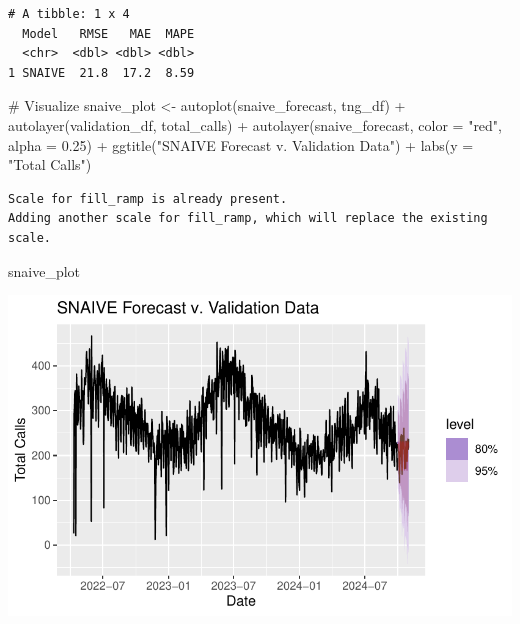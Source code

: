 \documentclass[
  letterpaper,
  DIV=11,
  numbers=noendperiod]{scrartcl}
\newenvironment{Shaded}{\begin{snugshade}}{\end{snugshade}}
\newcommand{\AttributeTok}[1]{\textcolor[rgb]{0.40,0.45,0.13}{#1}}
\newcommand{\CommentTok}[1]{\textcolor[rgb]{0.37,0.37,0.37}{#1}}
\newcommand{\FloatTok}[1]{\textcolor[rgb]{0.68,0.00,0.00}{#1}}
\newcommand{\FunctionTok}[1]{\textcolor[rgb]{0.28,0.35,0.67}{#1}}
\newcommand{\NormalTok}[1]{\textcolor[rgb]{0.00,0.23,0.31}{#1}}
\newcommand{\OtherTok}[1]{\textcolor[rgb]{0.00,0.23,0.31}{#1}}
\newcommand{\SpecialCharTok}[1]{\textcolor[rgb]{0.37,0.37,0.37}{#1}}
\newcommand{\StringTok}[1]{\textcolor[rgb]{0.13,0.47,0.30}{#1}}
\begin{document}
\begin{verbatim}
# A tibble: 1 x 4
  Model   RMSE   MAE  MAPE
  <chr>  <dbl> <dbl> <dbl>
1 SNAIVE  21.8  17.2  8.59
\end{verbatim}

\begin{Shaded}
\begin{Highlighting}[]
\CommentTok{\# Visualize}
\NormalTok{snaive\_plot }\OtherTok{\textless{}{-}} \FunctionTok{autoplot}\NormalTok{(snaive\_forecast, tng\_df) }\SpecialCharTok{+} 
  \FunctionTok{autolayer}\NormalTok{(validation\_df, total\_calls) }\SpecialCharTok{+} 
  \FunctionTok{autolayer}\NormalTok{(snaive\_forecast, }\AttributeTok{color =} \StringTok{"red"}\NormalTok{, }\AttributeTok{alpha =} \FloatTok{0.25}\NormalTok{) }\SpecialCharTok{+}
  \FunctionTok{ggtitle}\NormalTok{(}\StringTok{"SNAIVE Forecast v. Validation Data"}\NormalTok{) }\SpecialCharTok{+} 
  \FunctionTok{labs}\NormalTok{(}\AttributeTok{y =} \StringTok{"Total Calls"}\NormalTok{)}
\end{Highlighting}
\end{Shaded}

\begin{verbatim}
Scale for fill_ramp is already present.
Adding another scale for fill_ramp, which will replace the existing scale.
\end{verbatim}

\begin{Shaded}
\begin{Highlighting}[]
\NormalTok{snaive\_plot}
\end{Highlighting}
\end{Shaded}

\includegraphics{final_proj_group1_files/figure-pdf/visualize_snaive-1.pdf}
\end{document}
